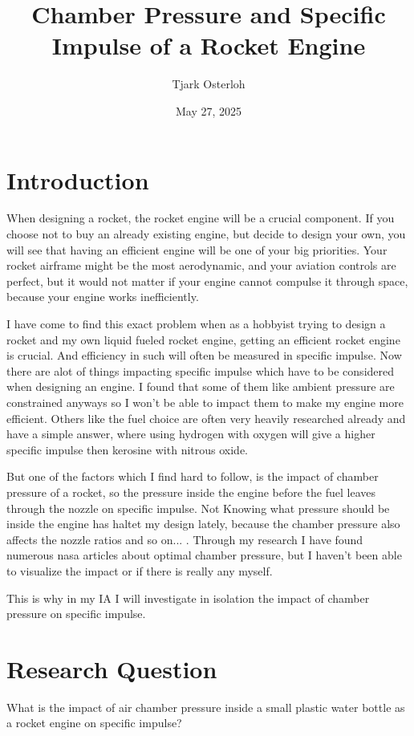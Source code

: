 \documentclass[12pt,a4paper]{article}
\title{\textbf{Chamber Pressure and Specific Impulse of a Rocket Engine}}
\author{Tjark Osterloh}
\date{May 27, 2025}
\begin{document}
\maketitle

\section{Introduction}

When designing a rocket, the rocket engine will be a crucial component. If you choose not to buy an already existing engine, but decide to design your own, you will see that having an efficient engine will be one of your big priorities. Your rocket airframe might be the most aerodynamic, and your aviation controls are perfect, but it would not matter if your engine cannot compulse it through space, because your engine works inefficiently.

I have come to find this exact problem when as a hobbyist trying to design a rocket and my own liquid fueled rocket engine, getting an efficient rocket engine is crucial. And efficiency in such will often be measured in specific impulse. Now there are alot of things impacting specific impulse which have to be considered when designing an engine. I found that some of them like ambient pressure are constrained anyways so I won't be able to impact them to make my engine more efficient. Others like the fuel choice are often very heavily researched already and have a simple answer, where using hydrogen with oxygen will give a higher specific impulse then kerosine with nitrous oxide.

But one of the factors which I find hard to follow, is the impact of chamber pressure of a rocket, so the pressure inside the engine before the fuel leaves through the nozzle on specific impulse. Not Knowing what pressure should be inside the engine has haltet my design lately, because the chamber pressure also affects the nozzle ratios and so on... . Through my research I have found numerous nasa articles about optimal chamber pressure, but I haven't been able to visualize the impact or if there is really any myself.

This is why in my IA I will investigate in isolation the impact of chamber pressure on specific impulse.

\section{Research Question}

What is the impact of air chamber pressure inside a small plastic water bottle as a rocket engine on specific impulse?
\end{document}
